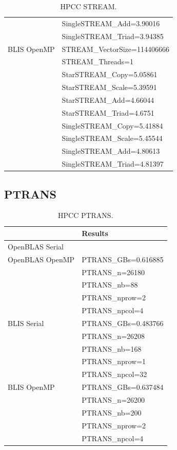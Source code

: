 \documentclass{report}
\begin{document}
\begin{table}[H]
\begin{center}
\begin{tabular}{ |l|l| }
                & SingleSTREAM\_Add=3.90016 \\
                & SingleSTREAM\_Triad=3.94385 \\
\hline
BLIS OpenMP     & STREAM\_VectorSize=114406666 \\
                & STREAM\_Threads=1 \\
                & StarSTREAM\_Copy=5.05861 \\
                & StarSTREAM\_Scale=5.39591 \\
                & StarSTREAM\_Add=4.66044 \\
                & StarSTREAM\_Triad=4.6751 \\
                & SingleSTREAM\_Copy=5.41884 \\
                & SingleSTREAM\_Scale=5.45544 \\
                & SingleSTREAM\_Add=4.80613 \\
                & SingleSTREAM\_Triad=4.81397 \\
\hline
\end{tabular}
\end{center}
\caption{\label{tab:table-name}HPCC STREAM.}
\end{table}


%
%
\subsection{PTRANS}

\begin{table}[H]
\begin{center}
\begin{tabular}{ |l|l| } 
\hline
                & Results \\ 
\hline
OpenBLAS Serial & \\ 
\hline
OpenBLAS OpenMP & PTRANS\_GBs=0.616885 \\
                & PTRANS\_n=26180 \\
                & PTRANS\_nb=88 \\
                & PTRANS\_nprow=2 \\
                & PTRANS\_npcol=4 \\
\hline
BLIS Serial     & PTRANS\_GBs=0.483766 \\
                & PTRANS\_n=26208 \\
                & PTRANS\_nb=168 \\
                & PTRANS\_nprow=1 \\
                & PTRANS\_npcol=32 \\
\hline
BLIS OpenMP     & PTRANS\_GBs=0.637484 \\
                & PTRANS\_n=26200 \\
                & PTRANS\_nb=200 \\
                & PTRANS\_nprow=2 \\
                & PTRANS\_npcol=4 \\
\hline
\end{tabular}
\end{center}
\caption{\label{tab:table-name}HPCC PTRANS.}
\end{table}
\end{document}
